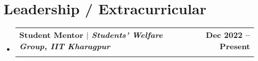 \documentclass[letterpaper]{article}
\makeatletter
\newcommand{\resumeItem}[1]{
  \item\small{
    {#1 \vspace{-2pt}}
  }
}
\newcommand{\resumeSubheading}[4]{
  \vspace{-2pt}\item
    \begin{tabular*}{1.0\textwidth}[t]{l@{\extracolsep{\fill}}r}
      \textbf{#1} & \textbf{\small #2} \\
      \textit{\small#3} & \textit{\small #4} \\
    \end{tabular*}\vspace{-7pt}
}
\newcommand{\resumeSubHeadingListStart}{\begin{itemize}[leftmargin=0.0in, label={}]}
\newcommand{\resumeSubHeadingListEnd}{\end{itemize}}
\newcommand{\resumeItemListStart}{\begin{itemize}}
\newcommand{\resumeItemListEnd}{\end{itemize}\vspace{-5pt}}
\makeatother
\begin{document}
\section{Leadership / Extracurricular}
  \resumeSubHeadingListStart
    
    \resumeSubheading{Student Mentor $|$ \emph{Students' Welfare Group, IIT Kharagpur}}{Dec 2022 -- Present}{}{}
      
  \resumeSubHeadingListEnd
\end{document}
